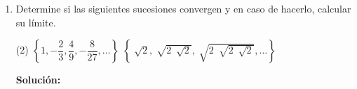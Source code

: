 \documentclass[12pt]{article}
\newenvironment{solucion}
{\begin{mdframed}[backgroundcolor=black!10]
		{\bf Solución:}\\
	}
	{
	\end{mdframed}
}
\newenvironment{preguntas}
{\begin{enumerate}\itemsep12pt
	}
	{
	\end{enumerate}
}
\newcommand{\ra}{\rightarrow}
\begin{document}
\begin{preguntas}
\begin{solucion}
\begin{enumerate}[a)]
\item $a_n = \dfrac{3^n+7}{5^n-3}$\\
			\\
			Como antes, vemos el límite del término general
			$$\lim\limits_{n\ra \infty} a_n = \lim\limits_{n\ra \infty} \dfrac{3^n+7}{5^n-3} \stackrel{L'H}{=} \lim\limits_{n\ra \infty} \dfrac{ln(3)3^n}{ln(5)5^n} = \lim\limits_{n\ra \infty} \dfrac{ln(3)}{ln(5)} \left(\dfrac{3}{5}\right)^n = 0$$
\item $a_n = \dfrac{n^3-n}{7n^3+6}$\\
			\\
			$$\lim\limits_{n\ra \infty} a_n = \lim\limits_{n\ra \infty} \dfrac{n^3-n}{7n^3+6} \stackrel{L'H}{=} \lim\limits_{n\ra \infty} \dfrac{3n^2-1}{21n^2}
			\stackrel{L'H}{=} \lim\limits_{n\ra \infty} \dfrac{6n}{42n} = \dfrac{1}{7}$$
\item $a_n = \dfrac{(-1)^n n}{n^3+4}$\\
\\
$$\lim\limits_{n\ra \infty} a_n 
= \lim\limits_{n\ra \infty} \dfrac{(-1)^n n}{n^3+4}
= \lim\limits_{n\ra \infty} (-1)^n \dfrac{n}{n^3+4}
= 0$$
\item $a_n=\ln(n+1)-\ln(n)$\\
\\
$$\lim\limits_{n\ra \infty} a_n 
= \lim\limits_{n\ra \infty} \ln(n+1)-\ln(n)
= \lim\limits_{n\ra \infty} \ln\left({\dfrac{n+1}{n}}\right)
= \ln(1) = 0$$
\end{enumerate}
\end{solucion}
\item Determine si las siguientes sucesiones convergen y en caso de hacerlo, calcular su límite.
\begin{tasks}(2)
\task $\left\{1, -\dfrac{2}{3}, \dfrac{4}{9}, -\dfrac{8}{27}, \dots \right\}$
\task $\left\{\sqrt[]{2}, \sqrt[]{2\ \sqrt[]{2}}, \sqrt[]{2\ \sqrt[]{2\ \sqrt[]{2}}}, \dots \right\}$
\end{tasks}
\begin{solucion}


\end{solucion}
\end{preguntas}
\end{document}
